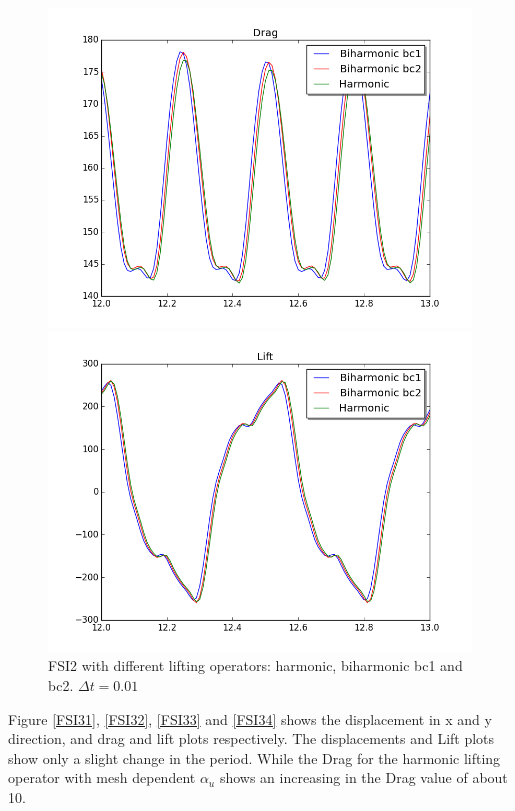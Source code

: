 \begin{figure}[H]
\begin{minipage}[b]{0.6\linewidth}
    \includegraphics[scale=0.40]{./Mesh_motion_results/FSI2_dt001_drag.png} 
    \vspace{4ex}
  \end{minipage}%
  \begin{minipage}[b]{0.6\linewidth}
    \centering
    \includegraphics[scale=0.40]{./Mesh_motion_results/FSI2_dt001_lift.png} 
    \vspace{4ex}
  \end{minipage} 
\caption {FSI2 with different lifting operators: harmonic, biharmonic bc1 and bc2. $\Delta t = 0.01$}
\label{fig:FSI2_motion-1} 
\end{figure}

Figure \ref{FSI31}, \ref{FSI32}, \ref{FSI33} and \ref{FSI34} shows the displacement in x and y direction, and drag and lift plots respectively. The displacements and Lift plots show only a slight change in the period. While the Drag for the harmonic lifting operator with mesh dependent $\alpha_u$ shows an increasing in the Drag value of about 10.

